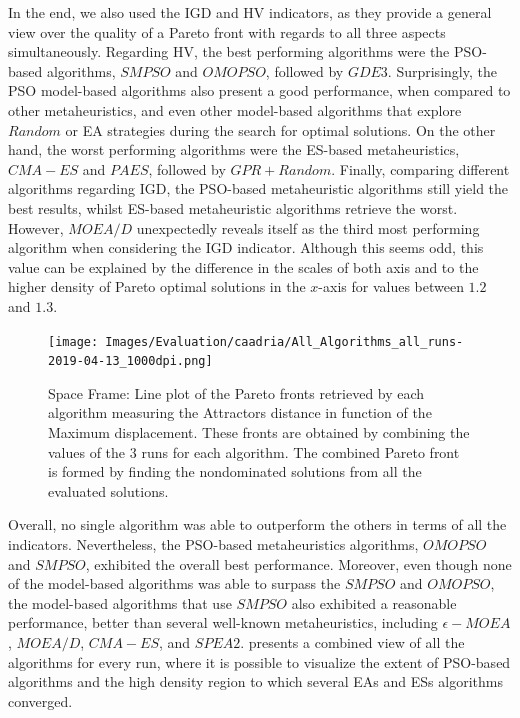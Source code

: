 In the end, we also used the \ac{IGD} and \ac{HV} indicators, as they provide a general view over the quality of a Pareto front with regards to all three aspects simultaneously. Regarding \ac{HV}, the best performing algorithms were the \ac{PSO}-based algorithms, $SMPSO$ and $OMOPSO$, followed by $GDE3$. Surprisingly, the \ac{PSO} model-based algorithms also present a good performance, when compared to other metaheuristics, and even other model-based algorithms that explore $Random$ or \ac{EA} strategies during the search for optimal solutions. On the other hand, the worst performing algorithms were the \ac{ES}-based metaheuristics, $CMA-ES$ and $PAES$, followed by $GPR+Random$. Finally, comparing different algorithms regarding \ac{IGD}, the \ac{PSO}-based metaheuristic algorithms still yield the best results, whilst \ac{ES}-based metaheuristic algorithms retrieve the worst. However, $MOEA/D$ unexpectedly reveals itself as the third most performing algorithm when considering the \ac{IGD} indicator. Although this seems odd, this value can be explained by the difference in the scales of both axis and to the higher density of Pareto optimal solutions in the $x$-axis for values between $1.2$ and $1.3$.

\begin{figure}[htbp]
	\centering
	\texttt{[image: Images/Evaluation/caadria/All\_Algorithms\_all\_runs-2019-04-13\_1000dpi.png]}
	\caption[Space Frame: Pareto front plot]{Space Frame: Line plot of the Pareto fronts retrieved by each algorithm measuring the Attractors distance in function of the Maximum displacement. These fronts are obtained by combining the values of the $3$ runs for each algorithm. The combined Pareto front is formed by finding the nondominated solutions from all the evaluated solutions.}
	\label{fig:allruns}
\end{figure}

Overall, no single algorithm was able to outperform the others in terms of all the indicators. Nevertheless, the \ac{PSO}-based metaheuristics algorithms, $OMOPSO$ and $SMPSO$, exhibited the overall best performance. Moreover, even though none of the model-based algorithms was able to surpass the $SMPSO$ and $OMOPSO$, the model-based algorithms that use $SMPSO$ also exhibited a reasonable performance, better than several well-known metaheuristics, including $\epsilon-MOEA$, $MOEA/D$, $CMA-ES$, and $SPEA2$.  presents a combined view of all the algorithms for every run, where it is possible to visualize the extent of \ac{PSO}-based algorithms and the high density region to which several \acp{EA} and \acp{ES} algorithms converged.

